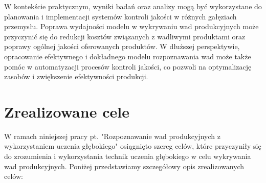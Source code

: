W kontekście praktycznym, wyniki badań oraz analizy mogą być wykorzystane do planowania i implementacji systemów kontroli jakości w różnych gałęziach przemysłu. Poprawa wydajności modelu w wykrywaniu wad produkcyjnych może przyczynić się do redukcji kosztów związanych z wadliwymi produktami oraz poprawy ogólnej jakości oferowanych produktów. W dłuższej perspektywie, opracowanie efektywnego i dokładnego modelu rozpoznawania wad może także pomóc w automatyzacji procesów kontroli jakości, co pozwoli na optymalizację zasobów i zwiększenie efektywności produkcji.

\section{Zrealizowane cele}

W ramach niniejszej pracy pt. "Rozpoznawanie wad produkcyjnych z wykorzystaniem uczenia głębokiego" osiągnięto szereg celów, które przyczyniły się do zrozumienia i wykorzystania technik uczenia głębokiego w celu wykrywania wad produkcyjnych. Poniżej przedstawiamy szczegółowy opis zrealizowanych celów:

